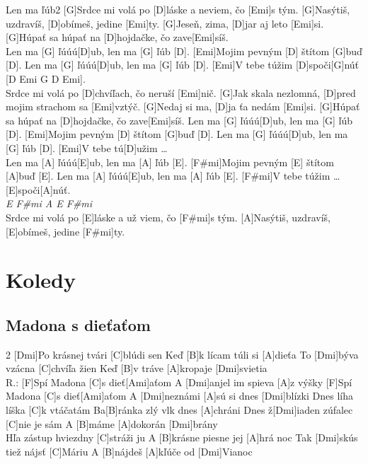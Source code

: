 \documentclass[12pt]{article}
\begin{document}
\begin{song}{Len ma ľúb}{2}
	[G]Srdce mi volá po [D]láske a neviem, čo [Emi]s tým.
	[G]Nasýtiš, uzdravíš, [D]obímeš, jedine [Emi]ty.
	[G]Jeseň, zima, [D]jar aj leto [Emi]si.
	[G]Húpať sa húpať na [D]hojdačke, čo zave[Emi]síš.
	\\
	Len ma [G] ľúúú[D]ub, len ma [G] ľúb [D].
	[Emi]Mojim pevným [D] štítom [G]buď [D].
	Len ma [G] ľúúú[D]ub, len ma [G] ľúb [D].
	[Emi]V tebe túžim [D]spoči[G]núť [D Emi G D Emi].
	\\
	[G]Srdce mi volá po [D]chvíľach, čo neruší [Emi]nič.
	[G]Jak skala nezlomná, 
	[D]pred mojim strachom sa [Emi]vztýč.
	[G]Nedaj si ma, [D]ja ťa nedám [Emi]si.
	[G]Húpať sa húpať na [D]hojdačke, čo zave[Emi]síš.
	\columnbreak
	Len ma [G] ľúúú[D]ub, len ma [G] ľúb [D].
	[Emi]Mojim pevným [D] štítom [G]buď [D].
	Len ma [G] ľúúú[D]ub, len ma [G] ľúb [D].
	[Emi]V tebe tú[D]užim \dots
	\\
	Len ma [A] ľúúú[E]ub, len ma [A] ľúb [E].
	[F#mi]Mojim pevným [E] štítom [A]buď [E].
	Len ma [A] ľúúú[E]ub, len ma [A] ľúb [E].
	[F#mi]V tebe túžim \dots [E]spoči[A]núť.
	\\
	\textit{E F\#mi A E F\#mi}
	\\
	[A]Srdce mi volá po [E]láske a už viem, čo [F#mi]s tým.
	[A]Nasýtiš, uzdravíš, [E]obímeš, jedine [F#mi]ty.
\end{song}

\newpage

\guitarOn

\section{Koledy}
\subsection{Madona s dieťaťom}
\begin{multicols}{2}
	[Dmi]Po krásnej tvári [C]blúdi sen
	Keď [B]k lícam túli si [A]dieťa
	To [Dmi]býva vzácna [C]chvíľa žien
	Keď [B]v tráve [A]kropaje [Dmi]svietia
	\\
	R.: [F]Spí Madona [C]s dieť[Ami]aťom
	A [Dmi]anjel im spieva [A]z výšky
	[F]Spí Madona [C]s dieť[Ami]aťom
	A [Dmi]neznámi [A]sú si dnes [Dmi]blízki
	\columnbreak
	[Dmi]Dnes líha líška [C]k vtáčatám
	Ba[B]ránka zlý vlk dnes [A]chráni
	Dnes ž[Dmi]iaden zúfalec [C]nie je sám
	A [B]máme [A]dokorán [Dmi]brány
	\\
	[Dmi]Hľa zástup hviezdny [C]stráži ju
	A [B]krásne piesne jej [A]hrá noc
	Tak [Dmi]skús tiež nájsť [C]Máriu
	A [B]nájdeš [A]kľúče od [Dmi]Vianoc
\end{multicols}
\end{document}
